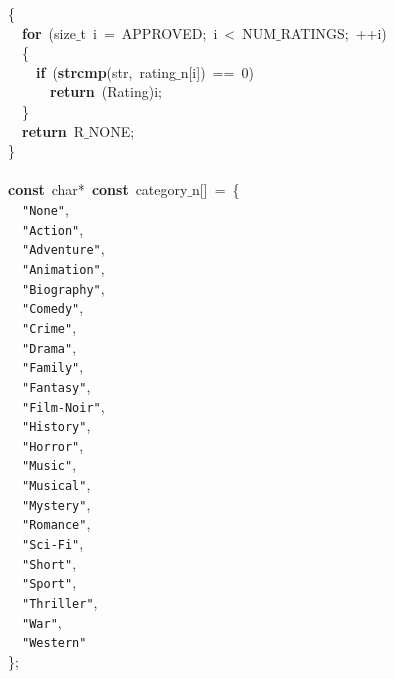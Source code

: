 \documentclass{article}
\begin{document}
\mbox{}\{ \\
\mbox{}\ \ \textbf{for}\ (size$\_$t\ i\ =\ APPROVED;\ i\ \textless{}\ NUM$\_$RATINGS;\ ++i) \\
\mbox{}\ \ \{ \\
\mbox{}\ \ \ \ \textbf{if}\ (\textbf{strcmp}(str,\ rating$\_$n[i])\ ==\ 0) \\
\mbox{}\ \ \ \ \ \ \textbf{return}\ (Rating)i; \\
\mbox{}\ \ \} \\
\mbox{}\ \ \textbf{return}\ R$\_$NONE; \\
\mbox{}\} \\
\mbox{} \\
\mbox{}\textbf{const}\ char*\ \textbf{const}\ category$\_$n[]\ =\ \{ \\
\mbox{}\ \ \texttt{"{}None"{}}, \\
\mbox{}\ \ \texttt{"{}Action"{}}, \\
\mbox{}\ \ \texttt{"{}Adventure"{}}, \\
\mbox{}\ \ \texttt{"{}Animation"{}}, \\
\mbox{}\ \ \texttt{"{}Biography"{}}, \\
\mbox{}\ \ \texttt{"{}Comedy"{}}, \\
\mbox{}\ \ \texttt{"{}Crime"{}}, \\
\mbox{}\ \ \texttt{"{}Drama"{}}, \\
\mbox{}\ \ \texttt{"{}Family"{}}, \\
\mbox{}\ \ \texttt{"{}Fantasy"{}}, \\
\mbox{}\ \ \texttt{"{}Film-Noir"{}}, \\
\mbox{}\ \ \texttt{"{}History"{}}, \\
\mbox{}\ \ \texttt{"{}Horror"{}}, \\
\mbox{}\ \ \texttt{"{}Music"{}}, \\
\mbox{}\ \ \texttt{"{}Musical"{}}, \\
\mbox{}\ \ \texttt{"{}Mystery"{}}, \\
\mbox{}\ \ \texttt{"{}Romance"{}}, \\
\mbox{}\ \ \texttt{"{}Sci-Fi"{}}, \\
\mbox{}\ \ \texttt{"{}Short"{}}, \\
\mbox{}\ \ \texttt{"{}Sport"{}}, \\
\mbox{}\ \ \texttt{"{}Thriller"{}}, \\
\mbox{}\ \ \texttt{"{}War"{}}, \\
\mbox{}\ \ \texttt{"{}Western"{}} \\
\mbox{}\}; \\
\end{document}
